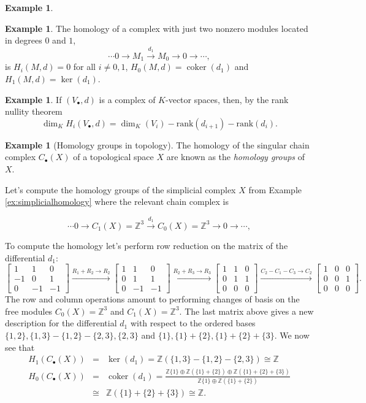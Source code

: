 \documentclass{amsart}[12pt]
\def\ker{\operatorname{ker}}
\def\coker{\operatorname{coker}}
\newcommand{\Z}{\mathbb{Z}}
\numberwithin{equation}{section}
\theoremstyle{plain} %
\theoremstyle{definition}
\newtheorem{ex}[equation]{Example}
\theoremstyle{remark}
\newcommand{\xra}[1]{\xrightarrow{#1}}
\begin{document}
\begin{ex}
\begin{ex} The homology of a complex with just two nonzero modules located in degrees $0$ and $1$, 
$$
\cdots 0 \to M_1 \xra{d_1} M_0 \to 0 \to \cdots,
$$
is $H_i(M,d) = 0$ for all $i \ne 0, 1$, $H_0(M,d) = \coker(d_1)$ and $H_1(M,d)  = \ker(d_1)$. 
\end{ex}

\begin{ex} If $(V_\bullet, d)$ is a complex of $K$-vector spaces, then, by the rank nullity theorem \[\dim_K H_i(V_\bullet,d)=\dim_K(V_i) - \mathrm{rank}(d_{i+1}) -\mathrm{rank}(d_{i}).\]
\end{ex}

\begin{ex}[Homology groups in topology] 
\label{ex:homologygps}
The homology of the singular chain complex $C_\bullet(X)$ of a topological space $X$ are known as the {\em homology groups} of $X$.

Let's compute the homology groups of the simplicial complex $X$ from Example \ref{ex:simplicialhomology} where the relevant chain complex is

$$
\cdots 0 \to C_1(X)=\Z^3 \xra{d_1} C_0(X)=\Z^3 \to 0 \to \cdots,
$$

To compute the homology let's perform row reduction on the matrix of the differential $d_1$:
 \[
 \begin{bmatrix}
  1 & 1 & 0 \\
  -1 & 0 & 1\\
  0 & -1 & -1
  \end{bmatrix}
  \xra{R_1+R_2 \to R_2}
  \begin{bmatrix}
  1 & 1 & 0 \\
  0 & 1 & 1\\
  0 & -1 & -1
  \end{bmatrix}
   \xra{R_2+R_3\to R_3}
   \begin{bmatrix}
  1 & 1 & 0 \\
  0 & 1 & 1\\
  0 & 0 & 0
  \end{bmatrix}
  \xra{C_2-C_1-C_3\to C_2}
   \begin{bmatrix}
  1 & 0 & 0 \\
  0 & 0 & 1\\
  0 & 0 & 0
  \end{bmatrix}.
  \]
The row and column operations amount to performing changes of basis on the free modules $C_0(X)=\Z^3$ and $C_1(X)=\Z^3$. The last matrix above gives a new description for the differential $d_1$ with respect to the ordered bases $\{1,2\}, \{1,3\}-\{1,2\}-\{2,3\}, \{2,3\}$ and $\{1\}, \{1\}+\{2\}, \{1\}+\{2\}+\{3\}$. 
We now see that
\begin{eqnarray*}
H_1(C_\bullet(X))&=&\ker(d_1)=\Z(\{1,3\}-\{1,2\}-\{2,3\}) \cong \Z\\
H_0(C_\bullet(X))&=&\coker(d_1)=\frac{\Z\{1\}\oplus\Z(\{1\}+\{2\})\oplus \Z(\{1\}+\{2\}+\{3\})}{\Z\{1\}\oplus\Z(\{1\}+\{2\})}\\
&\cong& \Z(\{1\}+\{2\}+\{3\})\cong \Z.
\end{eqnarray*}


\end{ex}
\end{ex}
\end{document}
